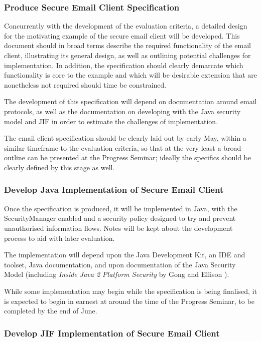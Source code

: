 \subsubsection{Produce Secure Email Client Specification}

Concurrently with the development of the evaluation criteria, a detailed design for the motivating example of the secure email client will be developed. This document should in broad terms describe the required functionality of the email client, illustrating its general design, as well as outlining potential challenges for implementation. In addition, the specification should clearly demarcate which functionality is core to the example and which will be desirable extension that are nonetheless not required should time be constrained.

The development of this specification will depend on documentation around email protocols, as well as the documentation on developing with the Java security model and JIF in order to estimate the challenges of implementation.

The email client specification should be clearly laid out by early May, within a similar timeframe to the evaluation criteria, so that at the very least a broad outline can be presented at the Progress Seminar; ideally the specifics should be clearly defined by this stage as well.

\subsubsection{Develop Java Implementation of Secure Email Client}

Once the specification is produced, it will be implemented in Java, with the SecurityManager enabled and a security policy designed to try and prevent unauthorised information flows. Notes will be kept about the development process to aid with later evaluation.

The implementation will depend upon the Java Development Kit, an IDE and toolset, Java documentation, and upon documentation of the Java Security Model (including \textit{Inside Java 2 Platform Security} by Gong and Ellison \cite{gong2003javasecurity}).

While some implementation may begin while the specification is being finalised, it is expected to begin in earnest at around the time of the Progress Seminar, to be completed by the end of June.

\subsubsection{Develop JIF Implementation of Secure Email Client}

